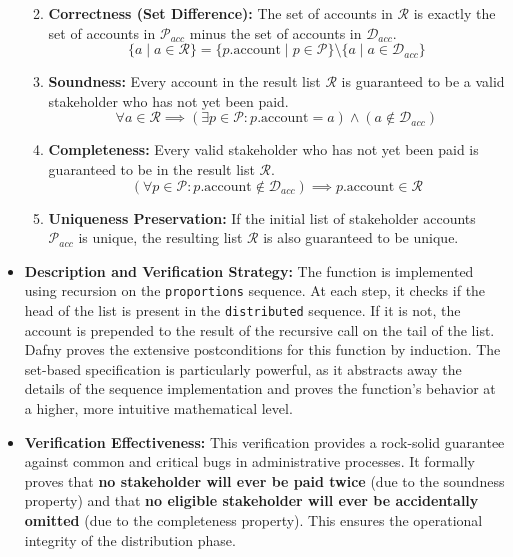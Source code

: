 \documentclass[
  english,
  onecolumn]{article}
\providecommand{\tightlist}{%
  \setlength{\itemsep}{0pt}\setlength{\parskip}{0pt}}
\begin{document}
\begin{itemize}
  \begin{enumerate}
  \def\labelenumi{\arabic{enumi}.}
  \tightlist
  \item
    \textbf{Correctness (Set Difference):} The set of accounts in
    \(\mathcal{R}\) is exactly the set of accounts in
    \(\mathcal{P}_{acc}\) minus the set of accounts in
    \(\mathcal{D}_{acc}\).
    \[ \{a \mid a \in \mathcal{R}\} = \{p.\text{account} \mid p \in \mathcal{P}\} \setminus \{a \mid a \in \mathcal{D}_{acc}\} \]
  \item
    \textbf{Soundness:} Every account in the result list \(\mathcal{R}\)
    is guaranteed to be a valid stakeholder who has not yet been paid.
    \[ \forall a \in \mathcal{R} \implies (\exists p \in \mathcal{P} : p.\text{account} = a) \land (a \notin \mathcal{D}_{acc}) \]
  \item
    \textbf{Completeness:} Every valid stakeholder who has not yet been
    paid is guaranteed to be in the result list \(\mathcal{R}\).
    \[ (\forall p \in \mathcal{P} : p.\text{account} \notin \mathcal{D}_{acc}) \implies p.\text{account} \in \mathcal{R} \]
  \item
    \textbf{Uniqueness Preservation:} If the initial list of stakeholder
    accounts \(\mathcal{P}_{acc}\) is unique, the resulting list
    \(\mathcal{R}\) is also guaranteed to be unique.
  \end{enumerate}
\item
  \textbf{Description and Verification Strategy:} The function is
  implemented using recursion on the \texttt{proportions} sequence. At
  each step, it checks if the head of the list is present in the
  \texttt{distributed} sequence. If it is not, the account is prepended
  to the result of the recursive call on the tail of the list. Dafny
  proves the extensive postconditions for this function by induction.
  The set-based specification is particularly powerful, as it abstracts
  away the details of the sequence implementation and proves the
  function's behavior at a higher, more intuitive mathematical level.
\item
  \textbf{Verification Effectiveness:} This verification provides a
  rock-solid guarantee against common and critical bugs in
  administrative processes. It formally proves that \textbf{no
  stakeholder will ever be paid twice} (due to the soundness property)
  and that \textbf{no eligible stakeholder will ever be accidentally
  omitted} (due to the completeness property). This ensures the
  operational integrity of the distribution phase.
\end{itemize}
\end{document}
